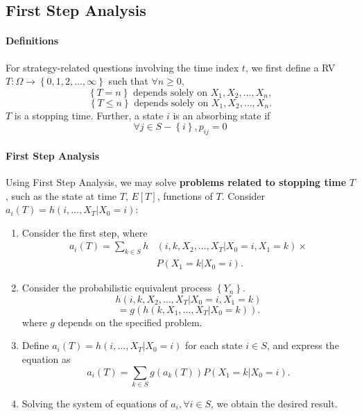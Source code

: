 \subsection{First Step Analysis}
\paragraph{Definitions}
For strategy-related questions involving the time index $t$, we first define a
RV $T:\Omega\to \left\{ 0,1,2,\ldots,\infty \right\} $ such that $\forall n\ge
0$,
\[\left\{ T=n \right\} \text{ depends solely on } X_1,X_2,\ldots,X_{n},\] 
\[\left\{ T\le n \right\} \text{ depends solely on } X_1,X_2,\ldots,X_{n}.\] 
$T$ is a \textcolor{Bittersweet}{stopping time}.
Further, a state $i$ is an \textcolor{Bittersweet}{absorbing state} if 
\[\forall j\in S-\left\{ i \right\}, p_{ij}=0\]

\paragraph{First Step Analysis}
Using First Step Analysis, we may solve \textbf{problems related to stopping
time} $T$, such as the state at time $T$, $E\left[ T \right]$, functions of
$T$. Consider $a_i\left( T \right)=h\left( i,\ldots,X_T|X_0=i \right) $:
\begin{enumerate}
  \item Consider the first step, where
    \begin{align*}
      a_i\left( T \right)=\sum_{k\in S}h&\left(i,k,X_2,\ldots,X_T|X_0=i,X_1=k \right)\times \\
      &P\left( X_1=k|X_0=i \right).
    \end{align*}
  \item Consider the probabilistic equivalent process $\left\{ Y_{n} \right\}
    $.
    \[h\left( i,k,X_2,\ldots,X_T|X_0=i,X_1=k \right)\]\[=g\left( h\left( k,X_1,\ldots,X_T|X_0=k \right) \right).\] 
    where $g$ depends on the specified problem.
  \item Define $a_i\left( T \right) =h\left( i,\ldots,X_T|X_0=i \right) $ for each state $i\in S$, and express
    the equation as
    \[a_i\left( T \right) =\sum_{k\in S} g\left( a_k\left( T \right) \right) P\left( X_1=k|X_0=i \right).\] 
  \item Solving the system of equations of $a_i, \forall i\in S$, we obtain the
    desired result.
\end{enumerate}

